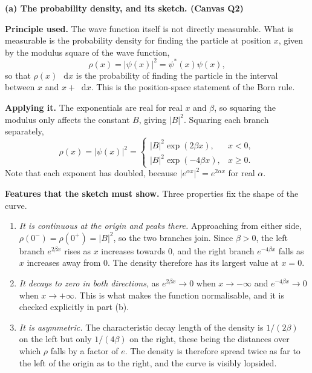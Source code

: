 \documentclass[12pt]{article}
\newif\ifsolutions
\renewcommand{\d}{\mathop{}\!\mathrm{d}}
\begin{document}
\ifsolutions
\begin{solutionbox}

\textbf{(a) The probability density, and its sketch. \hfill (Canvas Q2)}

\textbf{Principle used.} The wave function itself is not directly measurable. What is measurable is the probability density for finding the particle at position $x$, given by the modulus square of the wave function,
\[
    \rho(x)=|\psi(x)|^{2}=\psi^{*}(x)\psi(x),
\]
so that $\rho(x)\,\d x$ is the probability of finding the particle in the interval between $x$ and $x+\d x$. This is the position-space statement of the Born rule.

\textbf{Applying it.} The exponentials are real for real $x$ and $\beta$, so squaring the modulus only affects the constant $B$, giving $|B|^{2}$. Squaring each branch separately,
\[
    \rho(x)=|\psi(x)|^{2}=
    \begin{cases}
        |B|^{2}\exp(2\beta x), & x<0,\\[0.3em]
        |B|^{2}\exp(-4\beta x), & x\ge 0 .
    \end{cases}
\]
Note that each exponent has doubled, because $\left|e^{\alpha x}\right|^{2}=e^{2\alpha x}$ for real $\alpha$.

\textbf{Features that the sketch must show.} Three properties fix the shape of the curve.

\begin{enumerate}
    \item \emph{It is continuous at the origin and peaks there.} Approaching from either side, $\rho(0^{-})=\rho(0^{+})=|B|^{2}$, so the two branches join. Since $\beta>0$, the left branch $e^{2\beta x}$ rises as $x$ increases towards $0$, and the right branch $e^{-4\beta x}$ falls as $x$ increases away from $0$. The density therefore has its largest value at $x=0$.
    \item \emph{It decays to zero in both directions,} as $e^{2\beta x}\to 0$ when $x\to-\infty$ and $e^{-4\beta x}\to 0$ when $x\to+\infty$. This is what makes the function normalisable, and it is checked explicitly in part (b).
    \item \emph{It is asymmetric.} The characteristic decay length of the density is $1/(2\beta)$ on the left but only $1/(4\beta)$ on the right, these being the distances over which $\rho$ falls by a factor of $e$. The density is therefore spread twice as far to the left of the origin as to the right, and the curve is visibly lopsided.
\end{enumerate}


\end{solutionbox}
\end{document}
